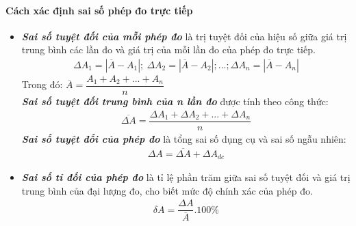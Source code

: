 \paragraph{Cách xác định sai số phép đo trực tiếp}
\begin{itemize}
\item \textit{\textbf{Sai số tuyệt đối của mỗi phép đo}} là trị tuyệt đối của hiệu số giữa giá trị trung bình các lần đo và giá trị của mỗi lần đo của phép đo trực tiếp.
\begin{align*}
\Delta A_1=\left|\overline{A}-{A}_1\right|;\ \Delta A_2=\left|\overline{A}-{A}_2\right|;...;\Delta A_n=\left|\overline{A}-{A}_n\right|
\end{align*}
Trong đó: $\overline{A}=\dfrac{A_1+A_2+...+A_n}{n}$\\
\textit{\textbf{Sai số tuyệt đối trung bình của n lần đo}} được tính theo công thức:
\begin{align*}
\overline{\Delta A}=\dfrac{\Delta A_1+\Delta A_2+...+\Delta A_n}{n}
\end{align*}
\textit{\textbf{Sai số tuyệt đối của phép đo}} là tổng sai số dụng cụ và sai số ngẫu nhiên:
\begin{align*}
\Delta A=\overline{\Delta A}+\Delta A_{dc}
\end{align*}
\item \textit{\textbf{Sai số tỉ đối của phép đo}} là tỉ lệ phần trăm giữa sai số tuyệt đối và giá trị trung bình của đại lượng đo, cho biết mức độ chính xác của phép đo.
\begin{align*}
\delta A=\dfrac{\Delta A}{\overline{A}}.100\%
\end{align*}
\end{itemize}
